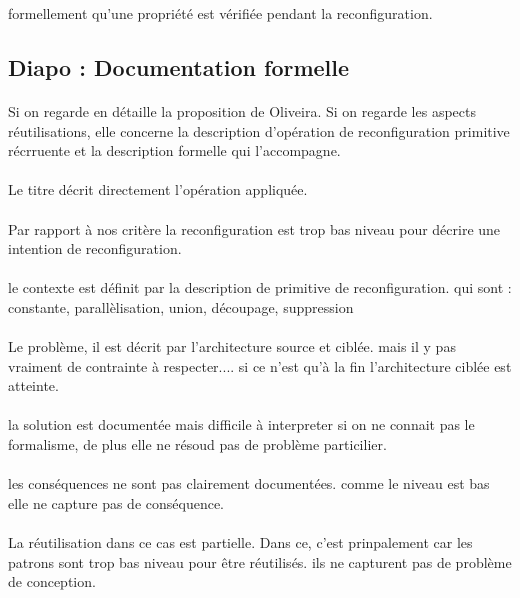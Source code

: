 formellement qu'une propriété est vérifiée pendant la reconfiguration. 

\subsection{Diapo : Documentation formelle}
\paragraph{} 
Si on regarde en détaille la proposition de Oliveira. 
%
Si on regarde les aspects réutilisations, elle concerne la description
d'opération de reconfiguration primitive récrruente et la description
formelle qui l'accompagne.  
%
\paragraph{} 
Le titre décrit directement l'opération appliquée.
%
\paragraph{} 
Par rapport à nos critère la reconfiguration est trop bas niveau pour
décrire une intention de reconfiguration. 
%
\paragraph{} 
le contexte est définit par la description de primitive de
reconfiguration. qui sont : constante, parallèlisation, union,
découpage, suppression 
%
\paragraph{} 
Le problème, il est décrit par l'architecture source et ciblée. mais
il y pas vraiment de contrainte à respecter.... si ce n'est qu'à la
fin l'architecture ciblée est atteinte.  
%
\paragraph{} 
la solution est documentée mais difficile à interpreter si
on ne connait pas le formalisme, de plus elle ne résoud pas de
problème particilier. 
%
\paragraph{} 
les conséquences ne sont pas
clairement documentées. comme le niveau est bas elle ne capture pas de
conséquence.   
%
\paragraph{} 
La réutilisation dans ce cas est partielle. Dans ce, c'est
prinpalement car les patrons sont trop bas niveau pour être
réutilisés. ils ne capturent pas de problème de conception. 

